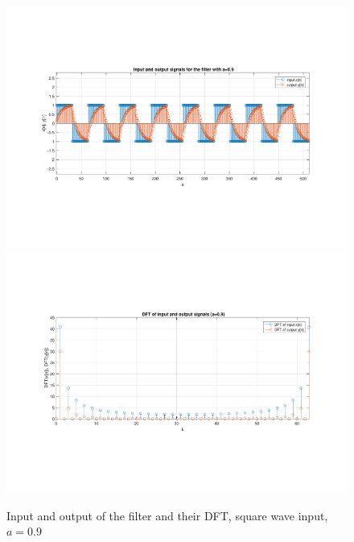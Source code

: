 \begin{figure} [H]
	\centering
	\includegraphics[trim={2.5cm 5cm 2.5cm 5cm}, clip, width=0.75\linewidth]{io_sw_7}
	\includegraphics[trim={2.5cm 5cm 2.5cm 5cm}, clip, width=0.75\linewidth]{dft_sw_7}
	\caption{Input and output of the filter and their DFT, square wave input, $a=0.9$}
	\label{fig:t1_io_sw_7}
\end{figure}


